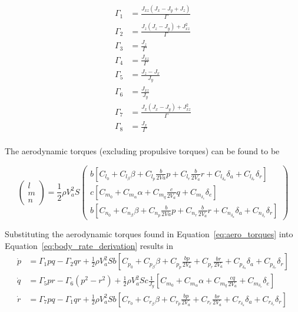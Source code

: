 \begin{equation}
\begin{split}
\Gamma_1&=\frac{J_{xz}(J_x-J_y+J_z)}{\Gamma}\\
\Gamma_2&=\frac{J_z(J_z-J_y)+J_{xz}^2}{\Gamma}\\
\Gamma_3&=\frac{J_z}{\Gamma}\\
\Gamma_4&=\frac{J_{xz}}{\Gamma}\\
\Gamma_5&=\frac{J_z-J_x}{J_y}\\
\Gamma_6&=\frac{J_{xz}}{J_y}\\
\Gamma_7&=\frac{J_x(J_x-J_y)+J_{xz}^2}{\Gamma}\\
\Gamma_8&=\frac{J_x}{\Gamma}\\
\end{split}
\end{equation}

The aerodynamic torques (excluding propulsive torques) can be found to be

\begin{equation}\label{eq:aero_torques}
\begin{pmatrix}
  l\\
  m\\
  n
 \end{pmatrix}
 =
 \frac{1}{2}\rho V_a^2S
 \begin{pmatrix}
  b\left[C_{l_0}+C_{l_\beta}\beta+C_{l_p}\frac{b}{2Va}p+C_{l_r}\frac{b}{2V_a}r+C_{l_{\delta_a}}\delta_a+C_{l_{\delta_r}}\delta_r\right]\\
  c\left[C_{m_0}+C_{m_\alpha}\alpha+C_{m_q}\frac{c}{2V_a}q+C_{m_{\delta_e}}\delta_e\right]\\
  b\left[C_{n_0}+C_{n_\beta}\beta+C_{n_p}\frac{b}{2Va}p+C_{n_r}\frac{b}{2V_a}r+C_{n_{\delta_a}}\delta_a+C_{n_{\delta_r}}\delta_r\right]
 \end{pmatrix}
\end{equation}

Substituting the aerodynamic torques found in Equation~\ref{eq:aero_torques} into Equation~\ref{eq:body_rate_derivation} results in \cite{beard2012small}
\begin{equation}\label{eq:body_rate_equations}
\begin{split}
 \dot{p}&=\Gamma_1pq-\Gamma_2qr+\frac{1}{2}\rho V_a^2Sb\left[C_{p_0}+C_{p_\beta}\beta+C_{p_p}\frac{bp}{2V_a}+C_{p_r}\frac{br}{2V_a}+C_{p_{\delta_a}}\delta_a+C_{p_{\delta_r}}\delta_r\right]\\
 \dot{q}&=\Gamma_5pr-\Gamma_6(p^2-r^2)+\frac{1}{2}\rho V_a^2Sc\frac{1}{J_y}\left[C_{m_0}+C_{m_\alpha}\alpha+C_{m_q}\frac{cq}{2V_a}+C_{m_{\delta_e}}\delta_e\right]\\
 \dot{r}&=\Gamma_7pq-\Gamma_1qr+\frac{1}{2}\rho V_a^2Sb\left[C_{r_0}+C_{r_\beta}\beta+C_{r_p}\frac{bp}{2V_a}+C_{r_r}\frac{br}{2V_a}+C_{r_{\delta_a}}\delta_a+C_{r_{\delta_r}}\delta_r\right]
\end{split} 
\end{equation}

